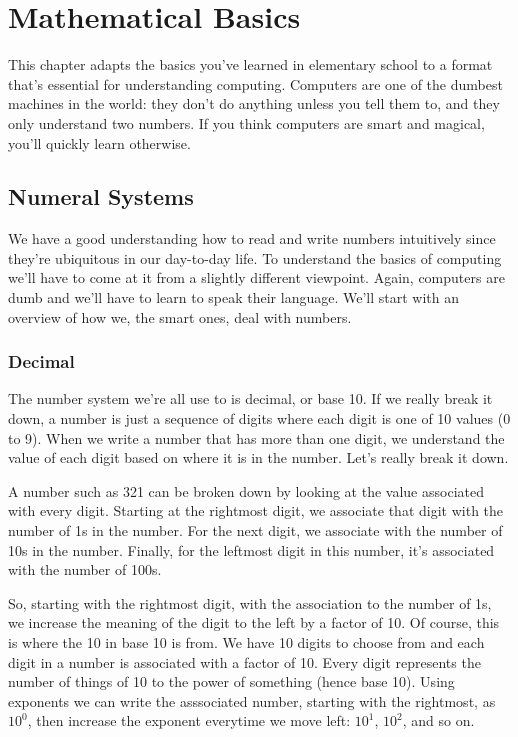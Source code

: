 \chapter{Mathematical Basics}

This chapter adapts the basics you've learned in elementary school to a format
that's essential for understanding computing.
Computers are one of the dumbest machines in the world: they don't do anything
unless you tell them to, and they only understand two numbers.
If you think computers are smart and magical, you'll quickly learn otherwise.

\section{Numeral Systems}

We have a good understanding how to read and write numbers intuitively since
they're ubiquitous in our day-to-day life. To understand the basics of computing
we'll have to come at it from a slightly different viewpoint. Again, computers
are dumb and we'll have to learn to speak their language. We'll start with an
overview of how we, the smart ones, deal with numbers.

\subsection{Decimal}

The number system we're all use to is decimal, or base 10. If we really break it
down, a number is just a sequence of digits where each digit is one of 10 values
(0 to 9). When we write a number that has more than one digit, we understand the
value of each digit based on where it is in the number. Let's really break it
down.

A number such as 321 can be broken down by looking at the value associated with
every digit. Starting at the rightmost digit, we associate that digit with the
number of 1s in the number. For the next digit, we associate with the number of
10s in the number. Finally, for the leftmost digit in this number, it's
associated with the number of 100s.

So, starting with the rightmost digit, with the association to the number of 1s,
we increase the meaning of the digit to the left by a factor of 10. Of course,
this is where the 10 in base 10 is from. We have 10 digits to choose from and
each digit in a number is associated with a factor of 10. Every digit represents
the number of things of 10 to the power of something (hence base 10). Using
exponents we can write the asssociated number, starting with the rightmost, as
$10^0$, then increase the exponent everytime we move left: $10^1$, $10^2$, and
so on.


